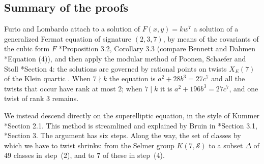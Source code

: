 \documentclass[12pt]{amsart}
\newcommand{\calS}{{\mathcal S}}
\numberwithin{equation}{section}
\theoremstyle{definition}
\begin{document}
\subsection*{Summary of the proofs}
Furio and Lombardo attach to a solution of $F(x,y) = kw^7$ a solution of a
generalized Fermat equation of signature $(2,3,7)$, by means of the covariants
of the cubic form $F$ \cite{Furio--Lombardo26}*{Proposition 3.2, Corollary 3.3} (compare
Bennett and Dahmen \cite{BD-13}*{Equation (4)}), and then apply the modular
method of Poonen, Schaefer and Stoll \cite{PSS-07}*{Section 4}: the solutions
are governed by rational points on twists $X_E(7)$ of the Klein quartic
\cite{HK-03}. When $7 \nmid k$ the equation is $a^2 + 28b^3 = 27c^7$ and all the
twists that occur have rank at most $2$; when $7 \mid k$ it is
$a^2 + 196b^3 = 27c^7$, and one twist of rank $3$ remains.

We instead descend directly on the superelliptic equation, in the style of
Kummer \cite{DG-95}*{Section 2.1}. This method is streamlined and explained by
Bruin in \cite{Bruin02-thesis}*{Section 3.1}, \cite{Bruin06-nn2}*{Section 3}.
The argument has six steps. Along the way, the set of classes by which we have
to twist shrinks: from the Selmer group $K(7,\calS)$ to a subset $\Delta$ of
$49$ classes in step~(2), and to $7$ of these in step~(4).
\end{document}
